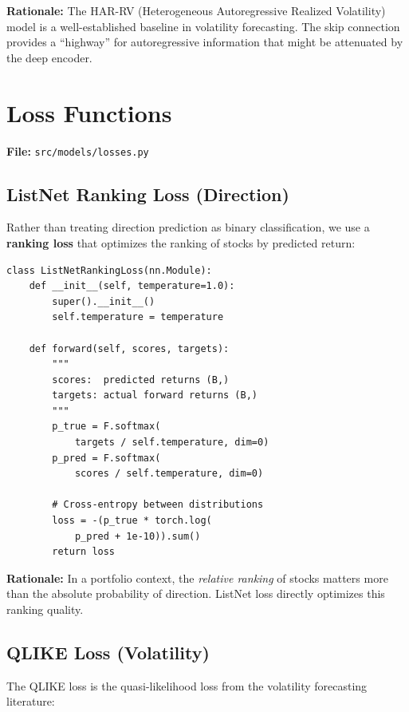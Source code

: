 \documentclass[12pt, a4paper]{article}
\begin{document}
\textbf{Rationale:}  The HAR-RV (Heterogeneous Autoregressive Realized Volatility) model is a well-established baseline in volatility forecasting.  The skip connection provides a ``highway'' for autoregressive information that might be attenuated by the deep encoder.


\section{Loss Functions}

\noindent\textbf{File:} \texttt{src/models/losses.py}

\subsection{ListNet Ranking Loss (Direction)}

Rather than treating direction prediction as binary classification, we use a \textbf{ranking loss} that optimizes the ranking of stocks by predicted return:

\begin{lstlisting}[caption={ListNet ranking loss}]
class ListNetRankingLoss(nn.Module):
    def __init__(self, temperature=1.0):
        super().__init__()
        self.temperature = temperature
    
    def forward(self, scores, targets):
        """
        scores:  predicted returns (B,)
        targets: actual forward returns (B,)
        """
        p_true = F.softmax(
            targets / self.temperature, dim=0)
        p_pred = F.softmax(
            scores / self.temperature, dim=0)
        
        # Cross-entropy between distributions
        loss = -(p_true * torch.log(
            p_pred + 1e-10)).sum()
        return loss
\end{lstlisting}

\textbf{Rationale:}  In a portfolio context, the \emph{relative ranking} of stocks matters more than the absolute probability of direction.  ListNet loss directly optimizes this ranking quality.


\subsection{QLIKE Loss (Volatility)}

The QLIKE loss is the quasi-likelihood loss from the volatility forecasting literature:
\end{document}
